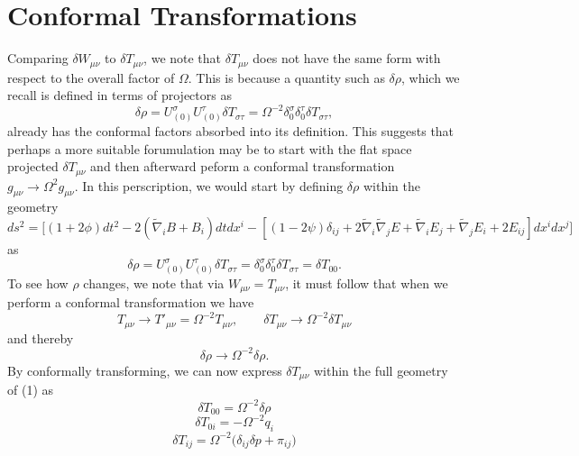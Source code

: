 \documentclass[10pt,letterpaper]{article}
\begin{document}
\section*{Conformal Transformations}
Comparing $\delta W_{\mu\nu}$ to $\delta T_{\mu\nu}$, we note that $\delta T_{\mu\nu}$ does not have the same form with respect to the overall factor of $\Omega$. This is because a quantity such as $\delta \rho$, which we recall is defined in terms of projectors as
\begin{equation}
	\delta \rho = U_{(0)}^\sigma U_{(0)}^\tau \delta T_{\sigma\tau} = \Omega^{-2} \delta^\sigma_0 \delta^\tau_0 \delta T_{\sigma\tau},
\end{equation}
already has the conformal factors absorbed into its definition. This suggests that perhaps a more suitable forumulation may be to start with the flat space projected $\delta T_{\mu\nu}$ and then afterward peform a conformal transformation $g_{\mu\nu} \to \Omega^2 g_{\mu\nu}$. In this perscription, we would start by defining $\delta \rho$ within the geometry
\begin{equation}
ds^2 = \bigg[ (1+2\phi)dt^2 - 2(\tilde\nabla_i B+ B_i)dtdx^i - [(1-2\psi)\delta_{ij} + 2\tilde\nabla_i\tilde\nabla_j E + \tilde\nabla_i E_j + \tilde\nabla_j E_i 
+ 2 E_{ij}]dx^idx^j\bigg]
\end{equation}
as 
\begin{equation}
	\delta \rho = U_{(0)}^\sigma U_{(0)}^\tau \delta T_{\sigma\tau} =  \delta^\sigma_0 \delta^\tau_0 \delta T_{\sigma\tau}= \delta T_{00}.
\end{equation}
To see how $\rho$ changes, we note that via $W_{\mu\nu} = T_{\mu\nu}$, it must follow that when we perform a conformal transformation we have
\begin{equation}
T_{\mu\nu} \to T'_{\mu\nu} = \Omega^{-2}T_{\mu\nu},\qquad \delta T_{\mu\nu} \to \Omega^{-2}\delta T_{\mu\nu}
\end{equation}
and thereby
\begin{equation}
	\delta \rho \to \Omega^{-2}\delta \rho.
\end{equation}
By conformally transforming, we can now express $\delta T_{\mu\nu}$ within the full geometry of (1) as
\begin{equation}
\delta T_{00} = \Omega^{-2} \delta \rho
\end{equation}
\begin{equation}
\delta T_{0i} = -\Omega^{-2}q_i
\end{equation}
\begin{equation}
\delta T_{ij} = \Omega^{-2}\big( \delta_{ij} \delta p + \pi_{ij}\big )
\end{equation}
\end{document}
